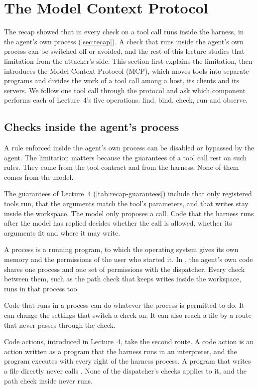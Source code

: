 \section{The Model Context Protocol}
\label{sec:mcp}

The recap showed that in \msa{} every check on a tool call runs inside the harness, in the agent's
own process (\cref{sec:recap}). A check that runs inside the agent's own process can be switched off
or avoided, and the rest of this lecture studies that limitation from the attacker's side. This section first explains the limitation, then introduces the
Model Context Protocol (MCP), which moves tools into separate programs and divides the work of a
tool call among a host, its clients and its servers. We follow one tool call through the protocol and
ask which component performs each of Lecture~4's five operations: find, bind, check, run and
observe.

\subsection{Checks inside the agent's process}
\label{sec:mcp-inside}

A rule enforced inside the agent's own process can be disabled or bypassed by the agent. The
limitation matters because the guarantees of a tool call rest on such rules. They come from the tool
contract and from the harness. None of them comes from the model.

The guarantees of Lecture~4 (\cref{tab:recap-guarantees}) include that only registered tools run,
that the arguments match the tool's parameters, and that writes stay inside the workspace. The model
only proposes a call. Code that the harness runs after the model has replied decides whether the
call is allowed, whether its arguments fit and where it may write.

A process is a running program, to which the operating system gives its own memory and the
permissions of the user who started it. In \msa{}, the agent's own code shares one process and one
set of permissions with the dispatcher. Every check between them, such as the path check that keeps
writes inside the workspace, runs in that process too.

Code that runs in a process can do whatever the process is permitted to do. It can change the
settings that switch a check on. It can also reach a file by a route that never passes through the
check.

Code actions, introduced in Lecture~4, take the second route. A code action is an action written as
a program that the harness runs in an interpreter, and the program executes with every right of the
harness process. A program that writes a file directly never calls . None of the
dispatcher's checks applies to it, and the path check inside  never runs.

